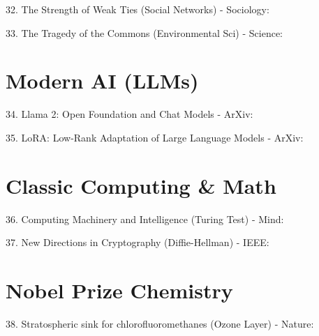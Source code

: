 \documentclass[12pt]{article}
\begin{document}
32. The Strength of Weak Ties (Social Networks) - Sociology:
\cite{Granovetter1973thestrengt}

33. The Tragedy of the Commons (Environmental Sci) - Science:
\cite{Hardin1968thetragedy}

\section{Modern AI (LLMs)}
34. Llama 2: Open Foundation and Chat Models - ArXiv:
\cite{Touvron2023llama2open}

35. LoRA: Low-Rank Adaptation of Large Language Models - ArXiv:
\cite{Hu2021loralowran}

\section{Classic Computing & Math}
36. Computing Machinery and Intelligence (Turing Test) - Mind:
\cite{TURING1950icomputing}

37. New Directions in Cryptography (Diffie-Hellman) - IEEE:
\cite{Diffie1976newdirecti}

\section{Nobel Prize Chemistry}
38. Stratospheric sink for chlorofluoromethanes (Ozone Layer) - Nature:
\cite{Molina1974stratosphe}
\end{document}
